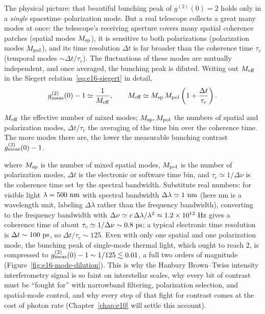 The physical picture: that beautiful bunching peak of \(g^{(2)}(0)=2\) holds only in a \emph{single} spacetime--polarization mode. But a real telescope collects a great many modes at once: the telescope's receiving aperture covers many spatial coherence patches (spatial modes \(M_{\rm sp}\)), it is sensitive to both polarizations (polarization modes \(M_{\rm pol}\)), and its time resolution \(\Delta t\) is far broader than the coherence time \(\tau_c\) (temporal modes \(\sim\Delta t/\tau_c\)). The fluctuations of these modes are mutually independent, and once averaged, the bunching peak is diluted. Writing out \(M_{\rm eff}\) in the Siegert relation~\eqref{eq:e16-siegert} in detail,
\begin{equation}
  g^{(2)}_{\rm meas}(0)-1\simeq\frac{1}{M_{\rm eff}},
  \qquad
  M_{\rm eff}\simeq M_{\rm sp}\,M_{\rm pol}\left(1+\frac{\Delta t}{\tau_c}\right).
  \label{eq:e16-mode-dilution}
\end{equation}
\begin{formulaexplain}
\(M_{\rm eff}\) the effective number of mixed modes; \(M_{\rm sp},M_{\rm pol}\) the numbers of spatial and polarization modes, \(\Delta t/\tau_c\) the averaging of the time bin over the coherence time. The more modes there are, the lower the measurable bunching contrast \(g^{(2)}_{\rm meas}(0)-1\).
\end{formulaexplain}
where \(M_{\rm sp}\) is the number of mixed spatial modes, \(M_{\rm pol}\) is the number of polarization modes, \(\Delta t\) is the electronic or software time bin, and \(\tau_c\simeq1/\Delta\nu\) is the coherence time set by the spectral bandwidth. Substitute real numbers: for visible light \(\lambda=500~{\rm nm}\) with spectral bandwidth \(\Delta\lambda\simeq1~{\rm nm}\) (here nm is a wavelength unit, labeling \(\Delta\lambda\) rather than the frequency bandwidth), converting to the frequency bandwidth with \(\Delta\nu\simeq c\,\Delta\lambda/\lambda^2\approx1.2\times10^{12}~{\rm Hz}\) gives a coherence time of about \(\tau_c\simeq1/\Delta\nu\sim0.8~{\rm ps}\); a typical electronic time resolution is \(\Delta t\sim100~{\rm ps}\), so \(\Delta t/\tau_c\sim125\). Even with only one spatial and one polarization mode, the bunching peak of single-mode thermal light, which ought to reach 2, is compressed to \(g^{(2)}_{\rm meas}(0)-1\sim1/125\lesssim0.01\), a full two orders of magnitude (Figure~\ref{fig:e16-mode-dilution}). This is why the Hanbury Brown--Twiss intensity interferometry signal is so faint on interstellar scales, why every bit of contrast must be ``fought for'' with narrowband filtering, polarization selection, and spatial-mode control, and why every step of that fight for contrast comes at the cost of photon rate (Chapter~\ref{chap:e10} will settle this account).

